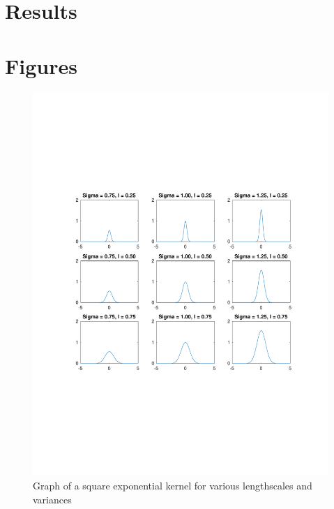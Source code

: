 \documentclass{article}
\begin{document}
\section{Results}
\section{Figures}
\begin{figure}[H]
  \centering
  \caption{Graph of a square exponential kernel for various lengthscales and variances}
  \label{fig:square_exp_kernel}
  \includegraphics[trim={0 7cm 0 7cm},clip,keepaspectratio=true,scale=0.5]{square_exp_kernel}
\end{figure}
\end{document}
